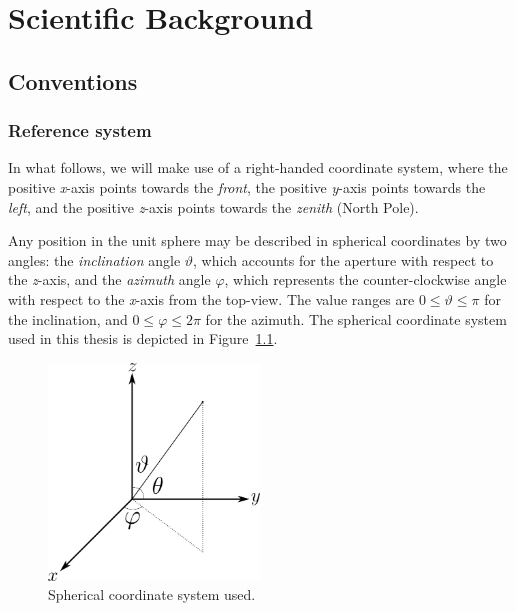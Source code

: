 \chapter{Scientific Background}
\label{chap:scientific}

\section{Conventions}
\subsection{Reference system}

In what follows, we will make use of a right-handed coordinate system, where the positive \textit{x}-axis points towards the \textit{front}, the positive \textit{y}-axis points towards the \textit{left}, and the positive \textit{z}-axis points towards the \textit{zenith} (North Pole).

Any position in the unit sphere may be described in spherical coordinates by two angles: the \textit{inclination} angle $\vartheta$, which accounts for the aperture with respect to the \textit{z}-axis, and the \textit{azimuth} angle $\varphi$, which represents the counter-clockwise angle with respect to the \textit{x}-axis from the top-view. 
The value ranges are $0 \leq \vartheta \leq \pi$ for the inclination, and $0 \leq \varphi \leq 2\pi$ for the azimuth. 
The spherical coordinate system used in this thesis is depicted in Figure~\ref{fig:sphericalreference}.

\begin{figure}[h]
\begin{center}
  \includegraphics[width=0.5\textwidth]{Figures/ScientificBackground/path829_2.png}
  \caption{Spherical coordinate system used.}
	\label{fig:sphericalreference}
	\end{center}
\end{figure}


